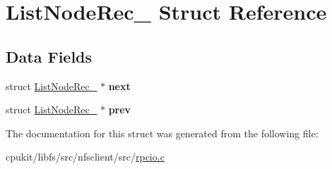 \hypertarget{structListNodeRec__}{}\section{List\+Node\+Rec\+\_\+ Struct Reference}
\label{structListNodeRec__}
\subsection*{Data Fields}
\begin{DoxyCompactItemize}
\item 
\mbox{\label{structListNodeRec___a74979159d5d822def70def8512bdc81f}} 
struct \mbox{\hyperlink{structListNodeRec__}{List\+Node\+Rec\+\_\+}} $\ast$ {\bfseries next}
\item 
\mbox{\label{structListNodeRec___a62cf933642d86b3fe507088d677bd725}} 
struct \mbox{\hyperlink{structListNodeRec__}{List\+Node\+Rec\+\_\+}} $\ast$ {\bfseries prev}
\end{DoxyCompactItemize}


The documentation for this struct was generated from the following file\+:\begin{DoxyCompactItemize}
\item 
cpukit/libfs/src/nfsclient/src/\mbox{\hyperlink{rpcio_8c}{rpcio.\+c}}\end{DoxyCompactItemize}
